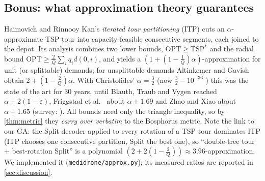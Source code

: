 \subsection{Bonus: what approximation theory guarantees}\label{sec:approx}
Haimovich and Rinnooy Kan's \emph{iterated tour partitioning} (ITP) \citep{haimovich1985bounds} cuts an
$\alpha$-approximate TSP tour into capacity-feasible consecutive segments, each joined to the depot. Its
analysis combines two lower bounds, $\mathrm{OPT}\ge\mathrm{TSP}^\ast$ and the radial bound
$\mathrm{OPT}\ge\tfrac2Q\sum_i q_i d(0,i)$, and yields a $(1+(1-\tfrac1Q)\alpha)$-approximation for unit
(or splittable) demands; for unsplittable demands Altinkemer and Gavish \citep{altinkemer1987heuristics,altinkemer1990heuristics}
obtain $2+(1-\tfrac2Q)\alpha$. With Christofides' $\alpha=\tfrac32$ \citep{christofides1976worst} (now
$\tfrac32-10^{-36}$ \citep{karlin2021slightly}) this was the state of the art for 30 years, until
Blauth, Traub and Vygen \citep{blauth2023improving} reached $\alpha+2(1-\varepsilon)$, Friggstad et al.\
\citep{friggstad2022improved} about $\alpha+1.69$ and Zhao and Xiao \citep{zhao2026approximating} about
$\alpha+1.65$ (survey: \citep{chen2023survey}). All bounds need only the triangle inequality, so by
\cref{thm:metric} they \emph{carry over verbatim} to the Bosphorus metric. Note the link to our GA: the
Split decoder applied to every rotation of a TSP tour dominates ITP (ITP chooses one consecutive
partition, Split the best one), so ``double-tree tour + best-rotation Split'' is a polynomial
$(2+2(1-\tfrac2Q))\approx3.96$-approximation. We implemented it (\texttt{medidrone/approx.py}); its measured
ratios are reported in \cref{sec:discussion}.
